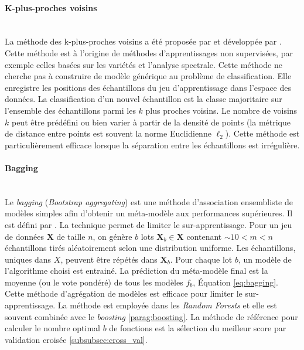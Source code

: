 \paragraph{K-plus-proches voisins} \mbox{} \label{parag:knn} \\
La méthode des k-plus-proches voisins a été proposée par \citeauthor{fix_discriminatory_1951} \cite{fix_discriminatory_1951} et développée par \citeauthor{cover_nearest_1967} \cite{cover_nearest_1967}.
Cette méthode est à l'origine de méthodes d'apprentissages non supervisées, par exemple celles basées sur les variétés et l'analyse spectrale.
Cette méthode ne cherche pas à construire de modèle générique au problème de classification.
Elle enregistre les positions des échantillons du jeu d'apprentissage dans l'espace des données.
La classification d'un nouvel échantillon est la classe majoritaire sur l'ensemble des échantillons parmi les $k$ plus proches voisins.
Le nombre de voisins $k$ peut être prédéfini ou bien varier à partir de la densité  de points (la métrique de distance entre points est souvent la norme Euclidienne $\ell_{2}$).
Cette méthode est particulièrement efficace lorsque la séparation entre les échantillons est irrégulière.


\paragraph{Bagging}\mbox{\label{parag:bagging}} \\
Le \textit{bagging} (\textit{\emph{B}ootstrap \emph{agg}regat\emph{ing}}) est une méthode d'association ensembliste de modèles simples afin d'obtenir un méta-modèle aux performances supérieures.
Il est défini par \citeauthor{breiman_bagging_1996} \cite{breiman_bagging_1996}.
La technique permet de limiter le sur-apprentissage.
Pour un jeu de données $\mathbf{X}$ de taille $n$, on génère $b$ lots $\mathbf{X}_b \in \mathbf{X}$ contenant $\sim 10 < m < n$ échantillons tirés aléatoirement selon une distribution uniforme.
Les échantillons, uniques dans $X$, peuvent être répétés dans $\mathbf{X}_b$.
Pour chaque lot $b$, un modèle de l'algorithme choisi est entrainé.
La prédiction du méta-modèle final est la moyenne (ou le vote pondéré) de tous les modèles $f_b$, Équation \ref{eq:bagging}.
Cette méthode d'agrégation de modèles est efficace pour limiter le sur-apprentissage.
La méthode est employée dans les \textit{Random Forests} et elle est souvent combinée avec le \textit{boosting} \ref{parag:boosting}.
La méthode de référence pour calculer le nombre optimal $b$ de fonctions est la sélection du meilleur score par validation croisée \ref{subsubsec:cross_val}.

